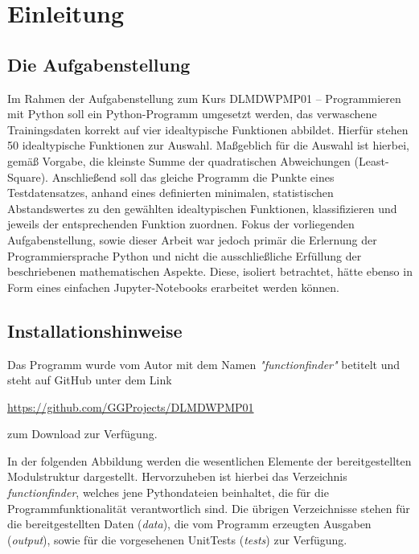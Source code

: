 \chapter{Einleitung}

\section{Die Aufgabenstellung}

Im Rahmen der Aufgabenstellung zum Kurs DLMDWPMP01 – Programmieren mit Python soll ein Python-Programm umgesetzt werden, das verwaschene Trainingsdaten korrekt auf vier idealtypische Funktionen abbildet. Hierfür stehen 50 idealtypische Funktionen zur Auswahl. Maßgeblich für die Auswahl ist hierbei, gemäß Vorgabe, die kleinste Summe der quadratischen Abweichungen (Least-Square).
Anschließend soll das gleiche Programm die Punkte eines Testdatensatzes, anhand eines definierten minimalen, statistischen Abstandswertes zu den gewählten idealtypischen Funktionen, klassifizieren und jeweils der entsprechenden Funktion zuordnen.
Fokus der vorliegenden Aufgabenstellung, sowie dieser Arbeit war jedoch primär die Erlernung der Programmiersprache Python und nicht die ausschließliche Erfüllung der beschriebenen mathematischen Aspekte. Diese, isoliert betrachtet, hätte ebenso in Form eines einfachen Jupyter-Notebooks erarbeitet werden können.


\section{Installationshinweise}

Das Programm wurde vom Autor mit dem Namen \emph{"functionfinder"} betitelt und steht auf GitHub unter dem Link \begin{center}\url{https://github.com/GGProjects/DLMDWPMP01}\end{center} zum Download zur Verfügung.

In der folgenden Abbildung werden die wesentlichen Elemente der bereitgestellten Modulstruktur dargestellt. Hervorzuheben ist hierbei das Verzeichnis \emph{functionfinder}, welches jene Pythondateien beinhaltet, die für die Programmfunktionalität verantwortlich sind.
Die übrigen Verzeichnisse stehen für die bereitgestellten Daten (\emph{data}), die vom Programm erzeugten Ausgaben (\emph{output}), sowie für die vorgesehenen UnitTests (\emph{tests}) zur Verfügung.

	
